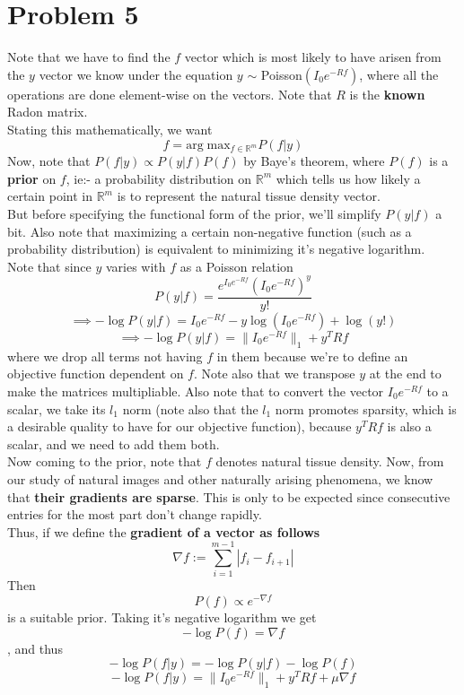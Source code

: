 \documentclass[a4paper,14pt]{article}
\numberwithin{definition}{section}
\numberwithin{mytheorem}{subsection}
\begin{document}
\section{Problem 5}
Note that we have to find the $f$ vector which is most likely to have arisen from the $y$ vector we know under the equation $y$ $\sim$ Poisson$(I_0e^{-Rf})$, where all the operations are done element-wise on the vectors. Note that $R$ is the \textbf{known} Radon matrix.\\
Stating this mathematically, we want
$$f = \mathrm{arg}\;\mathrm{max}_{f \in \mathbb{R}^m} P(f|y)$$
Now, note that $P(f|y) \propto P(y|f)P(f)$ by Baye's theorem, where $P(f)$ is a \textbf{prior} on $f$, ie:- a probability distribution on $\mathbb{R}^m$ which tells us how likely a certain point in $\mathbb{R}^m$ is to represent the natural tissue density vector.\\
But before specifying the functional form of the prior, we'll simplify $P(y|f)$ a bit. Also note that maximizing a certain non-negative function (such as a probability distribution) is equivalent to minimizing it's negative logarithm.\\
Note that since $y$ varies with $f$ as a Poisson relation
$$P(y|f) = \frac{e^{I_0e^{-Rf}}(I_0e^{-Rf})^y}{y!}$$
$$\implies -\log P(y|f) = I_0e^{-Rf} - y\log (I_0e^{-Rf}) + \log (y!)$$
$$\implies -\log P(y|f) = \lVert I_0e^{-Rf}\rVert_1 + y^TRf$$
where we drop all terms not having $f$ in them because we're to define an objective function dependent on $f$. Note also that we transpose $y$ at the end to make the matrices multipliable. Also note that to convert the vector $I_0e^{-Rf}$ to a scalar, we take its $l_1$ norm (note also that the $l_1$ norm promotes sparsity, which is a desirable quality to have for our objective function), because $y^TRf$ is also a scalar, and we need to add them both.\\
Now coming to the prior, note that $f$ denotes natural tissue density. Now, from our study of natural images and other naturally arising phenomena, we know that \textbf{their gradients are sparse}. This is only to be expected since consecutive entries for the most part don't change rapidly.\\
Thus, if we define the \textbf{gradient of a vector as follows}
$$\nabla f := \sum^{m - 1}_{i = 1} |f_i - f_{i + 1}|$$
Then
$$P(f) \propto e^{-\nabla f} $$
is a suitable prior. Taking it's negative logarithm we get 
$$-\log P(f) = \nabla f$$, and thus
$$-\log P(f|y) = -\log P(y|f) -\log P(f)$$
$$-\log P(f|y) = \lVert I_0e^{-Rf}\rVert_1 + y^TRf + \mu\nabla f$$
\end{document}
